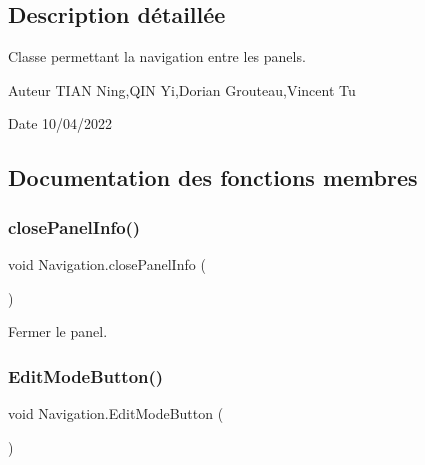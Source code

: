 \subsection{Description détaillée}
Classe permettant la navigation entre les panels. 

\begin{DoxyAuthor}{Auteur}
T\+I\+AN Ning,Q\+IN Yi,Dorian Grouteau,Vincent Tu 
\end{DoxyAuthor}
\begin{DoxyDate}{Date}
10/04/2022 
\end{DoxyDate}


\subsection{Documentation des fonctions membres}
\mbox{\label{class_navigation_a050da87d277fee7abae95d3e02912f12}} 
\subsubsection{\texorpdfstring{close\+Panel\+Info()}{closePanelInfo()}}
{\footnotesize\ttfamily void Navigation.\+close\+Panel\+Info (\begin{DoxyParamCaption}{ }\end{DoxyParamCaption})\hspace{0.3cm}{\ttfamily [inline]}}



Fermer le panel. 

\mbox{\label{class_navigation_af687f3df18da0e95175b04fe5cc7da56}} 
\subsubsection{\texorpdfstring{Edit\+Mode\+Button()}{EditModeButton()}}
{\footnotesize\ttfamily void Navigation.\+Edit\+Mode\+Button (\begin{DoxyParamCaption}{ }\end{DoxyParamCaption})\hspace{0.3cm}{\ttfamily [inline]}}



